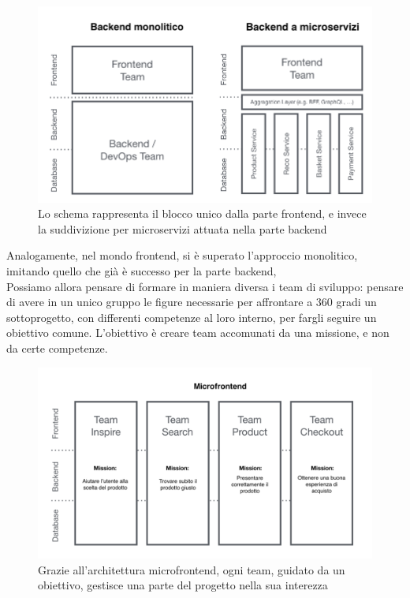 \begin{figure}[H]
    \centering
    \includegraphics[width=140mm]{img/monolite}
    \caption{Lo schema rappresenta il blocco unico dalla parte frontend, e invece la suddivizione per 
    microservizi attuata nella parte backend}
  \end{figure}
Analogamente, nel mondo frontend, si è superato l'approccio monolitico, imitando quello che già è 
successo per la parte backend,
\\
Possiamo allora pensare di formare in maniera diversa i team di sviluppo: pensare di avere in un unico gruppo
le figure necessarie per affrontare a 360 gradi un sottoprogetto, con differenti competenze al
loro interno, per fargli seguire un obiettivo comune. L'obiettivo è creare team accomunati da una missione, e non da certe competenze.
\begin{figure}[H]
    \centering
    \includegraphics[width=140mm]{img/microfrontend}
    \caption{Grazie all'architettura microfrontend, ogni team, guidato da un obiettivo, gestisce una 
    parte del progetto nella sua interezza}
  \end{figure}

